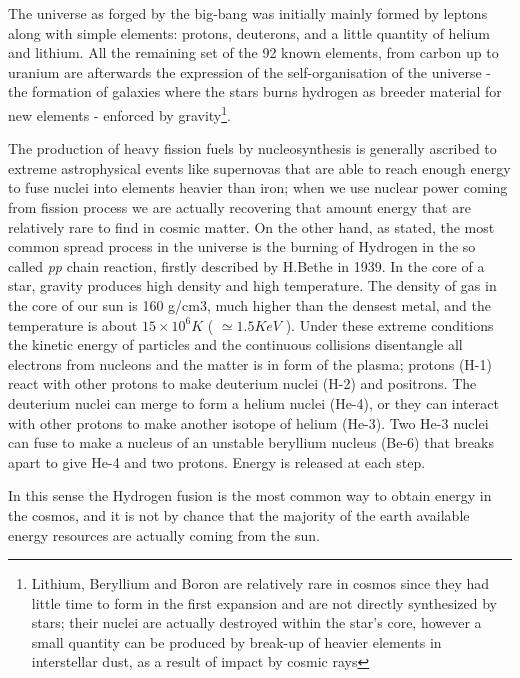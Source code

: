 The universe as forged by the big-bang was initially mainly formed by leptons along with simple elements: protons, deuterons, and a little quantity of helium and lithium. All the remaining set of the 92 known elements, from carbon up to uranium are afterwards the expression of the self-organisation of the universe - the formation of galaxies where the stars burns hydrogen as breeder material for new elements - enforced by gravity\footnote{ Lithium, Beryllium and Boron are relatively rare in cosmos since they had little time to form in the first expansion and are not directly synthesized by stars; their nuclei are actually destroyed within the star's core, however a small quantity can be produced by break-up of heavier elements in interstellar dust, as a result of impact by cosmic rays\cite{LiBeB_syntesis}}.

The production of heavy fission fuels by nucleosynthesis is generally ascribed to extreme astrophysical events like supernovas that are able to reach enough energy to fuse nuclei into elements heavier than iron; when we use nuclear power coming from fission process we are actually recovering that amount energy that are relatively rare to find in cosmic matter. 
% 
On the other hand, as stated, the most common spread process in the universe is the burning of Hydrogen in the so called \textit{pp} chain reaction, firstly described by H.Bethe in 1939. 
In the core of a star, gravity produces high density and high temperature. The density of gas in the core of our sun is 160 g/cm3, much higher than the densest metal, and the temperature is about $15\times10^6K$ ( $\simeq 1.5 KeV$ ). Under these extreme conditions the kinetic energy of particles and the continuous collisions disentangle all electrons from nucleons and the matter is in form of the plasma; protons (H-1) react with other protons to make deuterium nuclei (H-2) and positrons. The deuterium nuclei can merge to form a helium nuclei (He-4), or they can interact with other protons to make another isotope of helium (He-3). Two He-3 nuclei can fuse to make a nucleus of an unstable beryllium nucleus (Be-6) that breaks apart to give He-4 and two protons. Energy is released at each step.

In this sense the Hydrogen fusion is the most common way to obtain energy in the cosmos, and it is not by chance that the majority of the earth available energy resources are actually coming from the sun.

